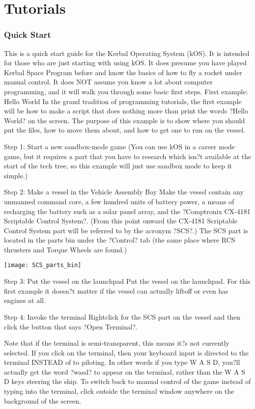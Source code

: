 \part{Tutorials}
	\section{Quick Start}
		This is a quick start guide for the Kerbal Operating System (kOS). It is intended for those who are just starting with using kOS. It does presume you have played Kerbal Space Program before and know the basics of how to fly a rocket under manual control. It does NOT assume you know a lot about computer programming, and it will walk you through some basic first steps.
		First example: Hello World
In the grand tradition of programming tutorials, the first example will be how to make a script that does nothing more than print the words ?Hello World? on the screen. The purpose of this example is to show where you should put the files, how to move them about, and how to get one to run on the vessel.

Step 1: Start a new sandbox-mode game
(You can use kOS in a career mode game, but it requires a part that you have to research which isn?t available at the start of the tech tree, so this example will just use sandbox mode to keep it simple.)

Step 2: Make a vessel in the Vehicle Assembly Bay
Make the vessel contain any unmanned command core, a few hundred units of battery power, a means of recharging the battery such as a solar panel array, and the ?Comptronix CX-4181 Scriptable Control System?. (From this point onward the CX-4181 Scriptable Control System part will be referred to by the acronym ?SCS?.) The SCS part is located in the parts bin under the ?Control? tab (the same place where RCS thrusters and Torque Wheels are found.)

\texttt{[image: SCS\_parts\_bin]}

Step 3: Put the vessel on the launchpad
Put the vessel on the launchpad. For this first example it doesn?t matter if the vessel can actually liftoff or even has engines at all.

Step 4: Invoke the terminal
Rightclick for the SCS part on the vessel and then click the button that says ?Open Terminal?.

Note that if the terminal is semi-transparent, this means it?s not currently selected. If you click on the terminal, then your keyboard input is directed to the terminal INSTEAD of to piloting. In other words if you type W A S D, you?ll actually get the word ?wasd? to appear on the terminal, rather than the W A S D keys steering the ship. To switch back to manual control of the game instead of typing into the terminal, click outside the terminal window anywhere on the background of the screen.

